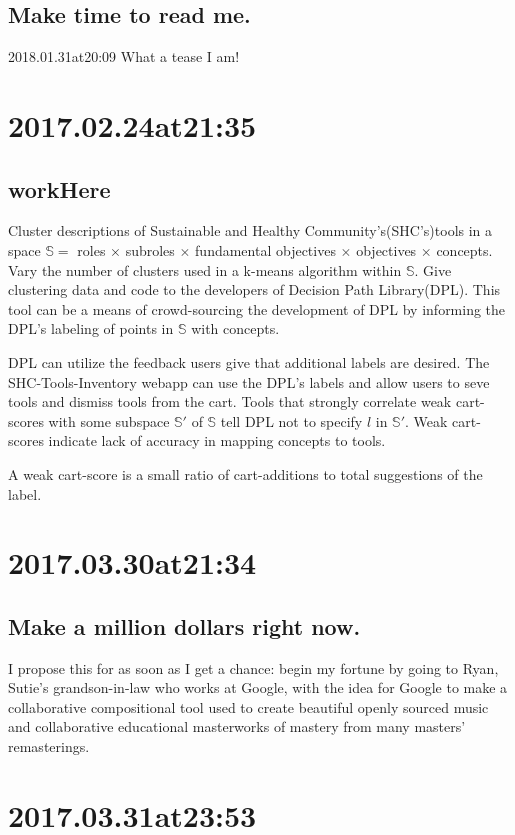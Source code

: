 \subsection*{ Make time to read me. }
2018.01.31at20:09 What a tease I am!

\section*{ 2017.02.24at21:35 }
\subsection*{ workHere }
Cluster descriptions of Sustainable and Healthy Community's(SHC's)tools in a space $\mathbb{S}=$ roles $\times$ subroles $\times$ fundamental objectives $\times$ objectives $\times$ concepts.
Vary the number of clusters used in a k-means algorithm within $\mathbb{S}$.
Give clustering data and code to the developers of Decision Path Library(DPL).
This tool can be a means of crowd-sourcing the development of DPL by informing the DPL's labeling of points in $\mathbb{S}$ with concepts.

DPL can utilize the feedback users give that additional labels are desired.
The SHC-Tools-Inventory webapp can use the DPL's labels and allow users to seve tools and dismiss tools from the cart.
Tools that strongly correlate weak cart-scores with some subspace $\mathbb{S}'$ of $\mathbb{S}$ tell DPL not to specify $l$ in $\mathbb{S}'$.
Weak cart-scores indicate lack of accuracy in mapping concepts to tools. 

A weak cart-score is a small ratio of cart-additions to total suggestions of the label.

\section*{ 2017.03.30at21:34 }
\subsection*{ Make a million dollars right now. }
I propose this for as soon as I get a chance: begin my fortune by going to Ryan, Sutie's grandson-in-law who works at Google, with the idea for Google to make a collaborative compositional tool used to create beautiful openly sourced music and collaborative educational masterworks of mastery from many masters' remasterings.

\section*{ 2017.03.31at23:53 }
